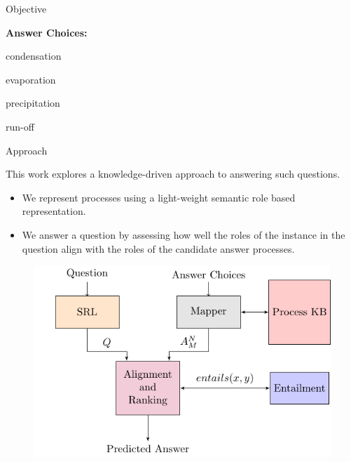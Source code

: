 \documentclass[final]{beamer}
\newlength{\onecolwid}
\begin{document}
\begin{frame}[t]
\begin{columns}[t]
\begin{column}{\onecolwid}
\begin{block}{Objective}
\begin{tcolorbox}[breakable,colback=orange!50!yellow!20!white,colframe=orange!90!black!40, boxsep=10pt, bottom=20pt]
\textbf{Answer Choices:}
\vspace{10mm}
\begin{itemize}
\setlength{\itemindent}{.5in}
\begin{minipage}{0.4\linewidth}
    \item condensation
    \item evaporation
\end{minipage}
\begin{minipage}{0.4\linewidth}
    \item precipitation
    \item run-off
\end{minipage}
\end{itemize}

\end{tcolorbox}

\end{block}



\begin{block}{Approach}

This work explores a knowledge-driven approach to answering such questions. 
\begin{itemize}
	\item We represent processes using a light-weight semantic role based representation.
	\item We answer a question by assessing how well the roles of the instance in the question align with the roles of the candidate answer processes.
\end{itemize}

\end{block}


\begin{figure}
\includegraphics[width=0.8\linewidth]{diagram.pdf}
\end{figure}


\end{column}
\end{columns}
\end{frame}
\end{document}
